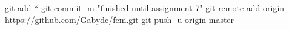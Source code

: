 git add *
git commit -m "finished until assignment 7"
git remote add origin https://github.com/Gabydc/fem.git
git push -u origin master
